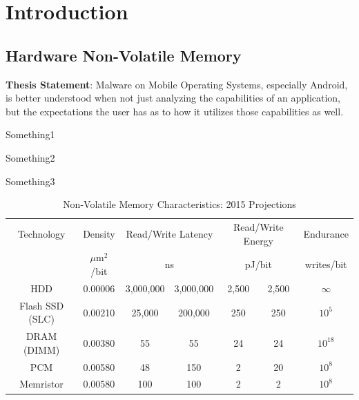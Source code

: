 \chapter{Introduction}
\label{sec:intro}

\section{Hardware Non-Volatile Memory}


\textbf{Thesis Statement}: Malware on Mobile Operating Systems, especially Android, is better understood when not just analyzing the capabilities of an application, but the expectations the user has as to how it utilizes those capabilities as well.\\


\begin{smitemize}
\item Something1
\item Something2
\item Something3
\end{smitemize}





\begin{table}[t]
\begin{small}
\begin{center}
\begin{tabular}{c|cccccc}
Technology & Density  & \multicolumn{2}{c}{Read/Write Latency} & \multicolumn{2}{c}{Read/Write Energy} & Endurance \\
           & $\mu$m$^2$/bit & \multicolumn{2}{c}{ns}                 & \multicolumn{2}{c}{pJ/bit}  & writes/bit\\
\hline
HDD & 0.00006 & 3,000,000 & 3,000,000 & 2,500 & 2,500 & $\infty$ \\
Flash SSD (SLC) & 0.00210 & 25,000 & 200,000 & 250 & 250 & $10^5$ \\
DRAM (DIMM) & 0.00380  & 55 & 55 & 24 & 24 & $10^{18}$ \\
PCM & 0.00580 & 48 & 150 & 2 & 20 & $10^8$ \\
Memristor & 0.00580  & 100 & 100 & 2 & 2 & $10^8$
\end{tabular}
\end{center}
\end{small}
\caption{Non-Volatile Memory Characteristics: 2015 Projections}
\label{tab:nvbm}
\end{table}



